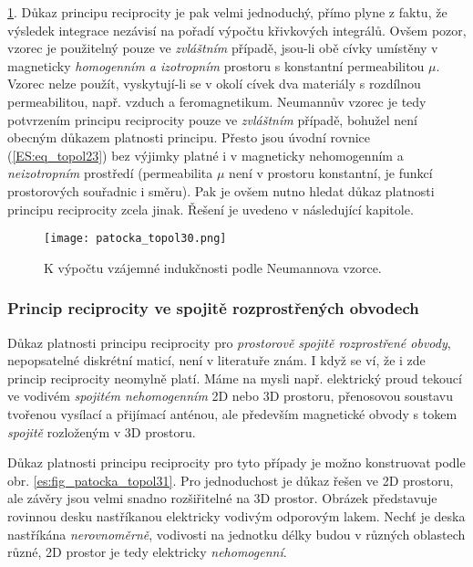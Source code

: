         \ref{es:fig_patocka_topol30}. Důkaz principu reciprocity je pak velmi jednoduchý, přímo 
        plyne z faktu, že výsledek integrace nezávisí na pořadí výpočtu křivkových integrálů. Ovšem 
        pozor, vzorec je použitelný pouze ve \emph{zvláštním} případě, jsou-li obě cívky umístěny v 
        magneticky \emph{homogenním a izotropním} prostoru s konstantní permeabilitou \(\mu\). 
        Vzorec nelze použít, vyskytují-li se v okolí cívek dva materiály s rozdílnou permeabilitou, 
        např. vzduch a feromagnetikum. Neumannův vzorec je tedy potvrzením principu reciprocity 
        pouze ve \emph{zvláštním} případě, bohužel není obecným důkazem platnosti principu. Přesto 
        jsou úvodní rovnice (\ref{ES:eq_topol23}) bez výjimky platné i v magneticky nehomogenním a 
        \emph{neizotropním} prostředí (permeabilita \(\mu\) není v prostoru konstantní, je funkcí 
        prostorových souřadnic i směru). Pak je ovšem nutno hledat důkaz platnosti principu 
        reciprocity zcela jinak. Řešení je uvedeno v následující kapitole.
        \begin{figure}[ht!]
          \centering  
          \texttt{[image: patocka\_topol30.png]}
          \caption{K výpočtu vzájemné indukčnosti podle Neumannova vzorce. \cite[s.~64]{Patocka4}} 
          \label{es:fig_patocka_topol30}
        \end{figure} 
     
      \subsubsection{Princip reciprocity ve spojitě rozprostřených obvodech}
        Důkaz platnosti principu reciprocity pro \emph{prostorově spojitě rozprostřené obvody}, 
        nepopsatelné diskrétní maticí, není v literatuře znám. I když se ví, že i zde princip 
        reciprocity neomylně platí. Máme na mysli např. elektrický proud tekoucí ve vodivém 
        \emph{spojitém nehomogenním} 2D nebo 3D prostoru, přenosovou soustavu tvořenou vysílací a 
        přijímací anténou, ale především magnetické obvody s tokem \emph{spojitě} rozloženým v 3D 
        prostoru.
        
        Důkaz platnosti principu reciprocity pro tyto případy je možno konstruovat podle obr. 
        \ref{es:fig_patocka_topol31}. Pro jednoduchost je důkaz řešen ve 2D prostoru, ale závěry 
        jsou velmi snadno rozšiřitelné na 3D prostor. Obrázek představuje rovinnou desku 
        nastříkanou elektricky vodivým odporovým lakem. Nechť je deska nastříkána 
        \emph{nerovnoměrně}, vodivosti na jednotku délky budou v různých oblastech různé, 2D 
        prostor je tedy elektricky \emph{nehomogenní}.
        
